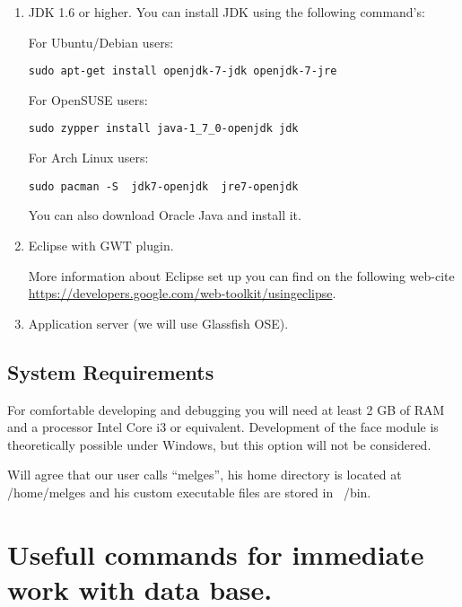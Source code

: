 \begin{enumerate}

\item JDK 1.6 or higher.
You can install JDK using the following command's:

For Ubuntu/Debian users:

\begin{lstlisting}
sudo apt-get install openjdk-7-jdk openjdk-7-jre
\end{lstlisting}

For OpenSUSE users:

\begin{lstlisting}
sudo zypper install java-1_7_0-openjdk jdk
\end{lstlisting}

For Arch Linux users:

\begin{lstlisting}
sudo pacman -S  jdk7-openjdk  jre7-openjdk
\end{lstlisting}

You can also download Oracle Java and install it.

\item Eclipse with GWT plugin.

More information about Eclipse set up you can find on the following web-cite \url{https://developers.google.com/web-toolkit/usingeclipse}.

\item Application server (we will use Glassfish OSE).

\end{enumerate}

\subsection{System Requirements}

For comfortable developing and debugging you will need at least 2 GB of RAM and a processor Intel Core i3 or equivalent. Development of the face module is theoretically possible under Windows, but this option will not be considered.

Will agree that our user calls ``melges'', his home directory is located at /home/melges and his custom executable files are stored in ~/bin.

\section{Usefull commands for immediate work with data base.}

